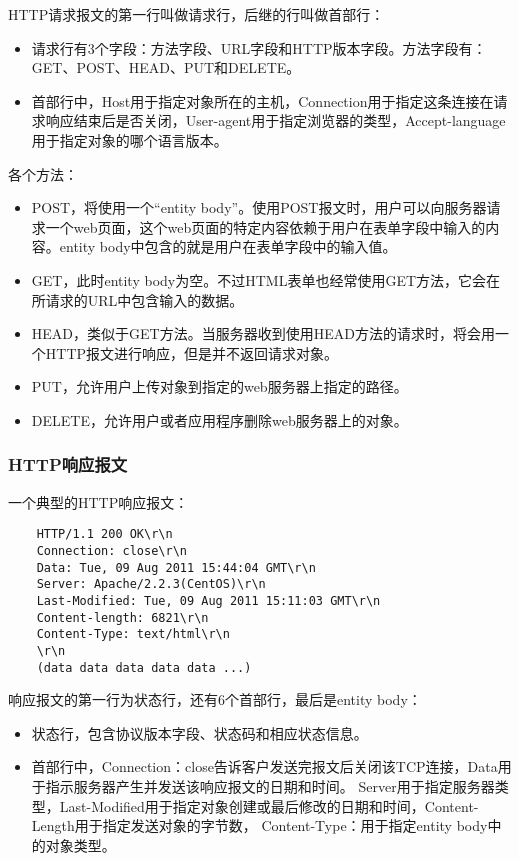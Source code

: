 \documentclass[a4paper,left=2.5cm,right=2.5cm,11pt]{article}
\begin{document}
	HTTP请求报文的第一行叫做请求行，后继的行叫做首部行：
	\begin{itemize}
		\item 请求行有3个字段：方法字段、URL字段和HTTP版本字段。方法字段有：GET、POST、HEAD、PUT和DELETE。
		\item 首部行中，Host用于指定对象所在的主机，Connection用于指定这条连接在请求响应结束后是否关闭，User-agent用于指定浏览器的类型，Accept-language用于指定对象的哪个语言版本。
	\end{itemize}

	各个方法：
	\begin{itemize}
		\item POST，将使用一个“entity body”。使用POST报文时，用户可以向服务器请求一个web页面，这个web页面的特定内容依赖于用户在表单字段中输入的内容。entity body中包含的就是用户在表单字段中的输入值。
		\item GET，此时entity body为空。不过HTML表单也经常使用GET方法，它会在所请求的URL中包含输入的数据。
		\item HEAD，类似于GET方法。当服务器收到使用HEAD方法的请求时，将会用一个HTTP报文进行响应，但是并不返回请求对象。
		\item PUT，允许用户上传对象到指定的web服务器上指定的路径。
		\item DELETE，允许用户或者应用程序删除web服务器上的对象。
	\end{itemize}

\subsubsection{HTTP响应报文}
	一个典型的HTTP响应报文：
	\begin{lstlisting}
	HTTP/1.1 200 OK\r\n
	Connection: close\r\n
	Data: Tue, 09 Aug 2011 15:44:04 GMT\r\n
	Server: Apache/2.2.3(CentOS)\r\n
	Last-Modified: Tue, 09 Aug 2011 15:11:03 GMT\r\n
	Content-length: 6821\r\n
	Content-Type: text/html\r\n
	\r\n
	(data data data data data ...)
	\end{lstlisting}

	响应报文的第一行为状态行，还有6个首部行，最后是entity body：
	\begin{itemize}
		\item 状态行，包含协议版本字段、状态码和相应状态信息。
		\item 首部行中，Connection：close告诉客户发送完报文后关闭该TCP连接，Data用于指示服务器产生并发送该响应报文的日期和时间。
			  Server用于指定服务器类型，Last-Modified用于指定对象创建或最后修改的日期和时间，Content-Length用于指定发送对象的字节数，
			  Content-Type：用于指定entity body中的对象类型。
	\end{itemize}
\end{document}
